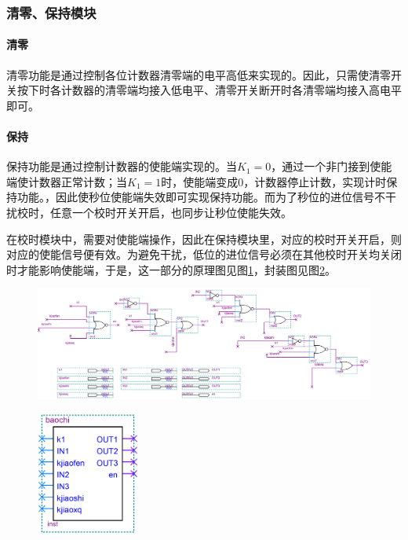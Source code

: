 \documentclass[12pt]{article}
\begin{document}
\subsubsection{清零、保持模块}
\paragraph{清零}清零功能是通过控制各位计数器清零端的电平高低来实现的。因此，只需使清零开关按下时各计数器的清零端均接入低电平、清零开关断开时各清零端均接入高电平即可。\par\paragraph{保持}保持功能是通过控制计数器的使能端实现的。当$K_1=0$，通过一个非门接到使能端使计数器正常计数；当$K_1=1$时，使能端变成0，计数器停止计数，实现计时保持功能。，因此使秒位使能端失效即可实现保持功能。而为了秒位的进位信号不干扰校时，任意一个校时开关开启，也同步让秒位使能失效。\par 在校时模块中，需要对使能端操作，因此在保持模块里，对应的校时开关开启，则对应的使能信号便有效。为避免干扰，低位的进位信号必须在其他校时开关均关闭时才能影响使能端，于是，这一部分的原理图见图\ref{fig:baochi}，封装图见图\ref{fig:fengzhuangbaochi}。
\begin{figure}[hp]
	\centering  
	\includegraphics[width=\textwidth]{picture/baochi.png} 
	\caption{}
	\label{fig:baochi}   
\end{figure}
\begin{figure}[hp]
	\centering  
	\includegraphics[width=0.3\textwidth]{picture/fenzhuangbaochi.png} 
	\caption{}
	\label{fig:fengzhuangbaochi}   
\end{figure}\par
\end{document}
